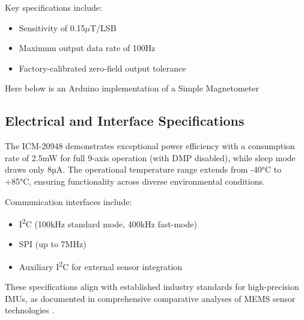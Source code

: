 Key specifications include:

\begin{itemize}
    \item Sensitivity of 0.15$\mu$T/LSB
    \item Maximum output data rate of 100Hz
    \item Factory-calibrated zero-field output tolerance \cite{Wen:2014}
\end{itemize}

Here below is an Arduino implementation of a Simple Magnetometer \cite{ArduCAM:ICM20948}

{
    \label{Magnetometer:example}
}


\subsection{Electrical and Interface Specifications}

The ICM-20948 demonstrates exceptional power efficiency with a consumption rate of 2.5mW for full 9-axis operation (with DMP disabled), while sleep mode draws only 8µA. The operational temperature range extends from -40°C to +85°C, ensuring functionality across diverse environmental conditions.

Communication interfaces include:
\begin{itemize}
    \item I\textsuperscript{2}C (100kHz standard mode, 400kHz fast-mode)
    \item SPI (up to 7MHz)
    \item Auxiliary I\textsuperscript{2}C for external sensor integration
\end{itemize}

These specifications align with established industry standards for high-precision IMUs, as documented in comprehensive comparative analyses of MEMS sensor technologies \cite{Bistrov:2012}.

